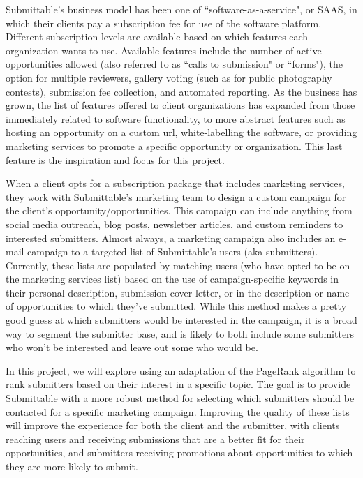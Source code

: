 \documentclass[]{report}   %
\begin{document}
Submittable's business model has been one of ``software-as-a-service", or SAAS, in which their clients pay a subscription fee for use of the software platform. Different subscription levels are available based on which features each organization wants to use. Available features include the number of active opportunities allowed (also referred to as ``calls to submission" or ``forms"), the option for multiple reviewers, gallery voting (such as for public photography contests), submission fee collection, and automated reporting. As the business has grown, the list of features offered to client organizations has expanded from those immediately related to software functionality, to more abstract features such as hosting an opportunity on a custom url, white-labelling the software, or providing marketing services to promote a specific opportunity or organization. This last feature is the inspiration and focus for this project.

When a client opts for a subscription package that includes marketing services, they work with Submittable's marketing team to design a custom campaign for the client's opportunity/opportunities. This campaign can include anything from social media outreach, blog posts, newsletter articles, and custom reminders to interested submitters. Almost always, a marketing campaign also includes an e-mail campaign to a targeted list of Submittable's users (aka submitters). Currently, these lists are populated by matching users (who have opted to be on the marketing services list) based on the use of campaign-specific keywords in their personal description, submission cover letter, or in the description or name of opportunities to which they've submitted. While this method makes a pretty good guess at which submitters would be interested in the campaign, it is a broad way to segment the submitter base, and is likely to both include some submitters who won't be interested and leave out some who would be. 

In this project, we will explore using an adaptation of the PageRank algorithm to rank submitters based on their interest in a specific topic. The goal is to provide Submittable with a more robust method for selecting which submitters should be contacted for a specific marketing campaign. Improving the quality of these lists will improve the experience for both the client and the submitter, with clients reaching users and receiving submissions that are a better fit for their opportunities, and submitters receiving promotions about opportunities to which they are more likely to submit. 
\end{document}
